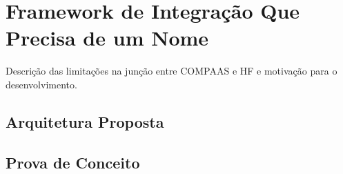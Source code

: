 \section{Framework de Integração Que Precisa de um Nome}
\label{sec:Framework}
Descrição das limitações na junção entre COMPAAS e HF e motivação para o desenvolvimento.

\subsection{Arquitetura Proposta}
\subsection{Prova de Conceito}
